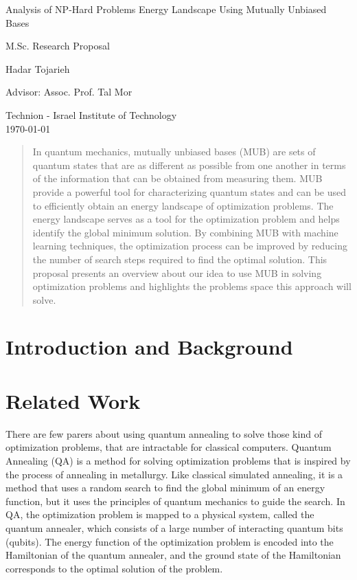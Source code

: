 \documentclass[12pt, a4paper]{article}
\begin{document}
    \onehalfspacing

    {\centering
    {\LARGE Analysis of NP-Hard Problems Energy Landscape Using Mutually Unbiased Bases \par}
    {\Medium M.Sc. Research Proposal }

    {\Small Hadar Tojarieh \par }
    {\Small Advisor: Assoc. Prof. Tal Mor \par }
    {\Small Technion - Israel Institute of Technology\\}
    \today
    \par
    }

    \singlespacing

    \begin{abstract}
        In quantum mechanics, mutually unbiased bases (MUB) are sets of quantum states that are as
        different as possible from one another in terms of the information that can be obtained from measuring them.
        MUB provide a powerful tool for characterizing quantum states and can be used to efficiently obtain an energy
        landscape of optimization problems.
        The energy landscape serves as a tool for the optimization problem and helps identify the global
        minimum solution.
        By combining MUB with machine learning techniques, the optimization process can be improved by reducing the
        number of search steps required to find the optimal solution.
        This proposal presents an overview about our idea to use MUB in solving optimization problems and highlights the problems space this approach will solve.

    \end{abstract}

    \tableofcontents

    \onehalfspacing


    \section{Introduction and Background}\label{sec:introduction-and-background}
    


    \section{Related Work}\label{sec:related-work}
    There are few parers about using quantum annealing to solve those kind of optimization problems, that are intractable
    for classical computers.
    Quantum Annealing (QA) is a method for solving optimization problems that is inspired by the process of annealing in
    metallurgy.
    Like classical simulated annealing, it is a method that uses a random search to find the global minimum
    of an energy function, but it uses the principles of quantum mechanics to guide the search.
    In QA, the optimization problem is mapped to a physical system, called the quantum annealer,
    which consists of a large number of interacting quantum bits (qubits).
    The energy function of the optimization problem is encoded into the Hamiltonian of the quantum annealer,
    and the ground state of the Hamiltonian corresponds to the optimal solution of the problem.
\end{document}
